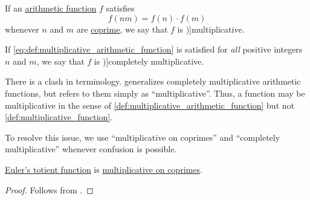 \begin{definition}\label{def:multiplicative_arithmetic_function}
  If an \hyperref[def:arithmetic_function]{arithmetic function} \( f \) satisfies
  \begin{equation}\label{eq:def:multiplicative_arithmetic_function}
    f(nm) = f(n) \cdot f(m)
  \end{equation}
  whenever \( n \) and \( m \) are \hyperref[def:coprime_numbers]{coprime}, we say that \( f \) is \term[ru=мультипликативная (функция) (\cite[def. 36]{Бухштаб1966ТеорияЧисел})]{multiplicative}.

  If \eqref{eq:def:multiplicative_arithmetic_function} is satisfied for \emph{all} positive integers \( n \) and \( m \), we say that \( f \) is \term[ru=вполне мультипликативная (функция) (\cite[def. 37]{Бухштаб1966ТеорияЧисел})]{completely multiplicative}.
\end{definition}
\begin{comments}
  \item There is a clash in terminology.  generalizes completely multiplicative arithmetic functions, but refers to them simply as \enquote{multiplicative}. Thus, a function may be multiplicative in the sense of \cref{def:multiplicative_arithmetic_function} but not \cref{def:multiplicative_function}.

  To resolve this issue, we use \enquote{multiplicative on coprimes} and \enquote{completely multiplicative} whenever confusion is possible.
\end{comments}

\begin{proposition}\label{thm:totient_function_multiplicative}
  \hyperref[def:eulers_totient_function]{Euler's totient function} is \hyperref[def:multiplicative_arithmetic_function]{multiplicative on coprimes}.
\end{proposition}
\begin{proof}
  Follows from .
\end{proof}

